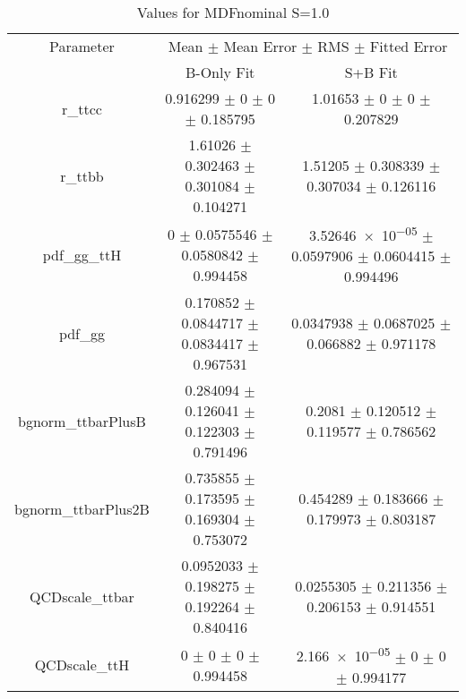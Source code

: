 \begin{table}
\centering
\caption{Values for MDFnominal S=1.0}
\begin{tabular}{ccc}
\toprule
Parameter & \multicolumn{2}{c}{Mean $\pm$ Mean Error $\pm$ RMS $\pm$ Fitted Error}\\
 & B-Only Fit & S+B Fit\\
\midrule
r\_ttcc & \num{0.916299} $\pm$ \num{0} $\pm$ \num{0} $\pm$ \num{0.185795} & \num{1.01653} $\pm$ \num{0} $\pm$ \num{0} $\pm$ \num{0.207829}\\
r\_ttbb & \num{1.61026} $\pm$ \num{0.302463} $\pm$ \num{0.301084} $\pm$ \num{0.104271} & \num{1.51205} $\pm$ \num{0.308339} $\pm$ \num{0.307034} $\pm$ \num{0.126116}\\
pdf\_gg\_ttH & \num{0} $\pm$ \num{0.0575546} $\pm$ \num{0.0580842} $\pm$ \num{0.994458} & \num{3.52646e-05} $\pm$ \num{0.0597906} $\pm$ \num{0.0604415} $\pm$ \num{0.994496}\\
pdf\_gg & \num{0.170852} $\pm$ \num{0.0844717} $\pm$ \num{0.0834417} $\pm$ \num{0.967531} & \num{0.0347938} $\pm$ \num{0.0687025} $\pm$ \num{0.066882} $\pm$ \num{0.971178}\\
bgnorm\_ttbarPlusB & \num{0.284094} $\pm$ \num{0.126041} $\pm$ \num{0.122303} $\pm$ \num{0.791496} & \num{0.2081} $\pm$ \num{0.120512} $\pm$ \num{0.119577} $\pm$ \num{0.786562}\\
bgnorm\_ttbarPlus2B & \num{0.735855} $\pm$ \num{0.173595} $\pm$ \num{0.169304} $\pm$ \num{0.753072} & \num{0.454289} $\pm$ \num{0.183666} $\pm$ \num{0.179973} $\pm$ \num{0.803187}\\
QCDscale\_ttbar & \num{0.0952033} $\pm$ \num{0.198275} $\pm$ \num{0.192264} $\pm$ \num{0.840416} & \num{0.0255305} $\pm$ \num{0.211356} $\pm$ \num{0.206153} $\pm$ \num{0.914551}\\
QCDscale\_ttH & \num{0} $\pm$ \num{0} $\pm$ \num{0} $\pm$ \num{0.994458} & \num{2.166e-05} $\pm$ \num{0} $\pm$ \num{0} $\pm$ \num{0.994177}\\
\bottomrule
\end{tabular}
\end{table}